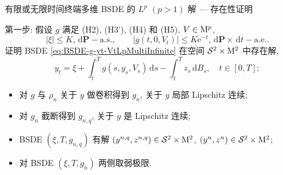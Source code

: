 \documentclass[xcolor=svgnames,serif,table,10pt]{beamer}
\newcommand{\As}{\mathrm{a.s.}}
\newcommand{\Ae}{\mathrm{a.e.}}
\newcommand*{\PR}{\mathrm{\mathbf{P}}}
\newcommand*{\dif}{\,\mathrm{d}}
\newcommand*{\prs}{\dif\PR-\As}
\newcommand*{\pts}{\dif\PR\times\dif t-\Ae}
\newcommand{\tT}[1][0]{[#1,T]}
\newcommand{\intT}[2][T]{\int^{#1}_{#2}}
\newcommand{\s}{\mathcal{S}}
\newcommand{\me}{\mathrm{e}}
\renewcommand{\M}{{\rm M}}
\begin{document}
\begin{frame}[t]{有限或无限时间终端多维 BSDE 的 $L^p$ $(p>1)$ 解 --- 存在性证明}
\vspace{-2ex}
  \begin{block}{第一步: \hspace{1.5cm} }
    \qquad 假设 $g$ 满足 (H2), (H3'), (H4) 和 (H5), $V\in\M^p$,
    \begin{equation}\label{eq:AssumptionFirstStepLpMultiInfinite}
      |\xi|\leq K,\prs, \qquad |g(t,0,V_t)|\leq K\me^{-t},\pts.
    \end{equation}
    证明 BSDE \eqref{eq:BSDE-g-yt-VtLpMultiInfinite} 在空间 $\s^2\times\M^2$
    中存在解,
    \begin{equation}\label{eq:BSDE-g-yt-VtLpMultiInfinite}
      y_t=\xi+\intT{t}g(s,y_s,V_s)\dif s-\intT{t}z_s\dif B_s,\quad t\in\tT;
    \end{equation}
  \end{block}
  \pause
  \begin{itemize}
    \item 对 $g$ 与 $\rho_n$ 关于 $y$ 做\alert{卷积}得到 $g_n$, 关于 $y$ 局部 Lipschitz 连续;
    \item 对 $g_n$ \alert{截断}得到 $g_{n,q}$, 关于 $y$ 是 Lipschitz 连续;
    \item BSDE $(\xi,T,g_{n,q})$ 有解 $(y^{n,q},z^{n,q})\in\s^2\times\M^2$, $(y^{n},z^{n})\in\s^2\times\M^2$;
    \item 对 BSDE $(\xi,T,g_n)$ 两侧取\alert{弱极限}.
  \end{itemize}
\end{frame}
\end{document}

